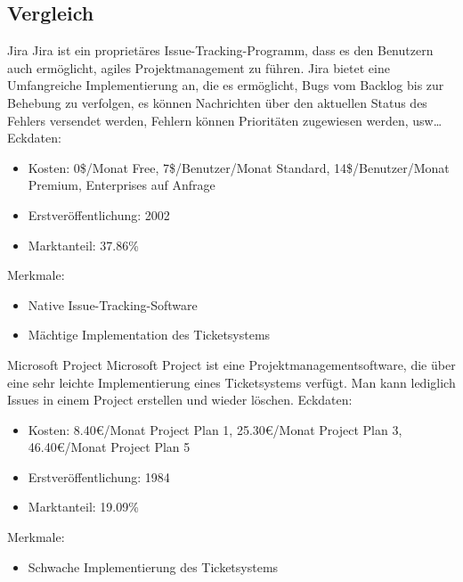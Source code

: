 \subsection{Vergleich}	
Jira
Jira ist ein proprietäres Issue-Tracking-Programm, dass es den Benutzern auch ermöglicht, agiles Projektmanagement zu führen. Jira bietet eine Umfangreiche Implementierung an, die es ermöglicht, Bugs vom Backlog bis zur Behebung zu verfolgen, es können Nachrichten über den aktuellen Status des Fehlers versendet werden, Fehlern können Prioritäten zugewiesen werden, usw…		
Eckdaten:
\begin{itemize}
	\item Kosten: 0\$/Monat Free, 7\$/Benutzer/Monat Standard, 14\$/Benutzer/Monat Premium, Enterprises auf Anfrage
	\item Erstveröffentlichung: 2002
	\item Marktanteil: 37.86\%
\end{itemize}				
Merkmale:
\begin{itemize}
	\item Native Issue-Tracking-Software
	\item Mächtige Implementation des Ticketsystems
\end{itemize}				
Microsoft Project			
Microsoft Project ist eine Projektmanagementsoftware, die über eine sehr leichte Implementierung eines Ticketsystems verfügt. Man kann lediglich Issues in einem Project erstellen und wieder löschen.
Eckdaten:
\begin{itemize}
	\item Kosten: 8.40€/Monat Project Plan 1, 25.30€/Monat Project Plan 3, 46.40€/Monat Project Plan 5
	\item Erstveröffentlichung: 1984
	\item Marktanteil: 19.09\%
\end{itemize}
Merkmale:
\begin{itemize}
	\item Schwache Implementierung des Ticketsystems
\end{itemize}				
